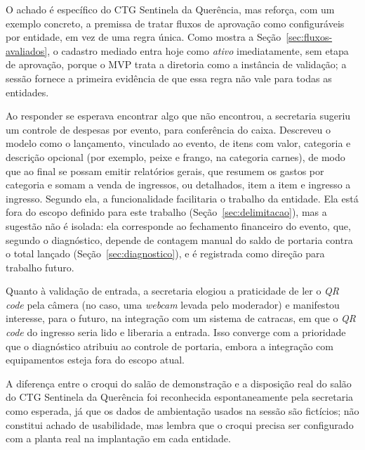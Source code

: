 \documentclass[12pt,a4paper]{article}
\begin{document}
O achado é específico do CTG Sentinela da Querência, mas reforça, com um exemplo concreto, a premissa
de tratar fluxos de aprovação como configuráveis por entidade, em vez de uma regra única. Como mostra a
Seção~\ref{sec:fluxos-avaliados}, o cadastro mediado entra hoje como \textit{ativo} imediatamente, sem
etapa de aprovação, porque o MVP trata a diretoria como a instância de validação; a sessão fornece a
primeira evidência de que essa regra não vale para todas as entidades.

Ao responder se esperava encontrar algo que não encontrou, a secretaria sugeriu um controle
de despesas por evento, para conferência do caixa. Descreveu o modelo como o lançamento, vinculado
ao evento, de itens com valor, categoria e descrição opcional (por exemplo, peixe e frango, na
categoria carnes), de modo que ao final se possam emitir relatórios gerais, que resumem os gastos por
categoria e somam a venda de ingressos, ou detalhados, item a item e ingresso a ingresso. Segundo
ela, a funcionalidade facilitaria o trabalho da entidade. Ela está fora do escopo definido para
este trabalho (Seção~\ref{sec:delimitacao}), mas a sugestão não é isolada: ela corresponde ao
fechamento financeiro do evento, que, segundo o diagnóstico, depende de contagem manual do saldo de
portaria contra o total lançado (Seção~\ref{sec:diagnostico}), e é registrada como direção para
trabalho futuro.

Quanto à validação de entrada, a secretaria elogiou a praticidade de ler o
\textit{QR code} pela câmera (no caso, uma \textit{webcam} levada pelo moderador) e manifestou
interesse, para o futuro, na integração com um sistema de catracas, em que o \textit{QR code} do
ingresso seria lido e liberaria a entrada. Isso converge com a prioridade que o diagnóstico atribuiu
ao controle de portaria, embora a integração com equipamentos esteja fora do escopo atual.

A diferença entre o croqui do salão de demonstração e a disposição real do salão do CTG Sentinela da
Querência foi reconhecida espontaneamente pela secretaria como esperada, já que os dados de
ambientação usados na sessão são fictícios; não constitui achado de usabilidade, mas lembra que o croqui precisa
ser configurado com a planta real na implantação em cada entidade.
\end{document}
